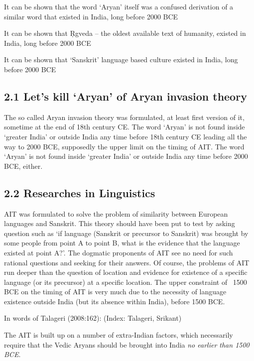  \item It can be shown that the word ‘Aryan’ itself was a confused derivation of a similar word that existed in India, long before 2000 BCE

 \item It can be shown that Ṛgveda – the oldest available text of humanity, existed in India, long before 2000 BCE

 \item It can be shown that ‘Sanskrit’ language based culture existed in India, long before 2000 BCE


\subsection{2.1 Let’s kill ‘Aryan’ of Aryan invasion theory}

The so called Aryan invasion theory was formulated, at least first version of it, sometime at the end of 18th century CE. The word ‘Aryan’ is not found inside ‘greater India’ or outside India any time before 18th century CE leading all the way to 2000 BCE, supposedly the upper limit on the timing of AIT. The word ‘Aryan’ is not found inside ‘greater India’ or outside India any time before 2000 BCE, either.


\subsection{2.2 Researches in Linguistics}

AIT was formulated to solve the problem of similarity between European languages and Sanskrit. This theory should have been put to test by asking question such as ‘if language (Sanskrit or precursor to Sanskrit) was brought by some people from point A to point B, what is the evidence that the language existed at point A?’. The dogmatic proponents of AIT see no need for such rational questions and seeking for their answers. Of course, the problems of AIT run deeper than the question of location and evidence for existence of a specific language (or its precursor) at a specific location. The upper constraint of ~1500 BCE on the timing of AIT is very much due to the necessity of language existence outside India (but its absence within India), before 1500 BCE.

In words of Talageri (2008:162): (Index: Talageri, Srikant)

\begin{myquote}
The AIT is built up on a number of extra-Indian factors, which necessarily require that the Vedic Aryans should be brought into India \textit{no earlier than 1500 BCE}.
\end{myquote}

